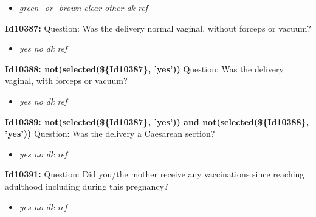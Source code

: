 \documentclass{article}%
\begin{document}
%
\begin{itemize}%
\item%
\textit{green\_or\_brown\newline%
 clear\newline%
 other\newline%
 dk\newline%
 ref\newline%
}%
\end{itemize}%
\textbf{Id10387: \newline%
}%
Question: Was the delivery normal vaginal, without forceps or vacuum?\newline%
%
\begin{itemize}%
\item%
\textit{yes\newline%
 no\newline%
 dk\newline%
 ref\newline%
}%
\end{itemize}%
\textbf{Id10388: not(selected(\$\{Id10387\}, 'yes'))\newline%
}%
Question: Was the delivery vaginal, with forceps or vacuum?\newline%
%
\begin{itemize}%
\item%
\textit{yes\newline%
 no\newline%
 dk\newline%
 ref\newline%
}%
\end{itemize}%
\textbf{Id10389: not(selected(\$\{Id10387\}, 'yes')) and not(selected(\$\{Id10388\}, 'yes'))\newline%
}%
Question: Was the delivery a Caesarean section?\newline%
%
\begin{itemize}%
\item%
\textit{yes\newline%
 no\newline%
 dk\newline%
 ref\newline%
}%
\end{itemize}%
\textbf{Id10391: \newline%
}%
Question: Did you/the mother receive any vaccinations since reaching adulthood including during this pregnancy?\newline%
%
\begin{itemize}%
\item%
\textit{yes\newline%
 no\newline%
 dk\newline%
 ref\newline%
}%
\end{itemize}%
\end{document}
